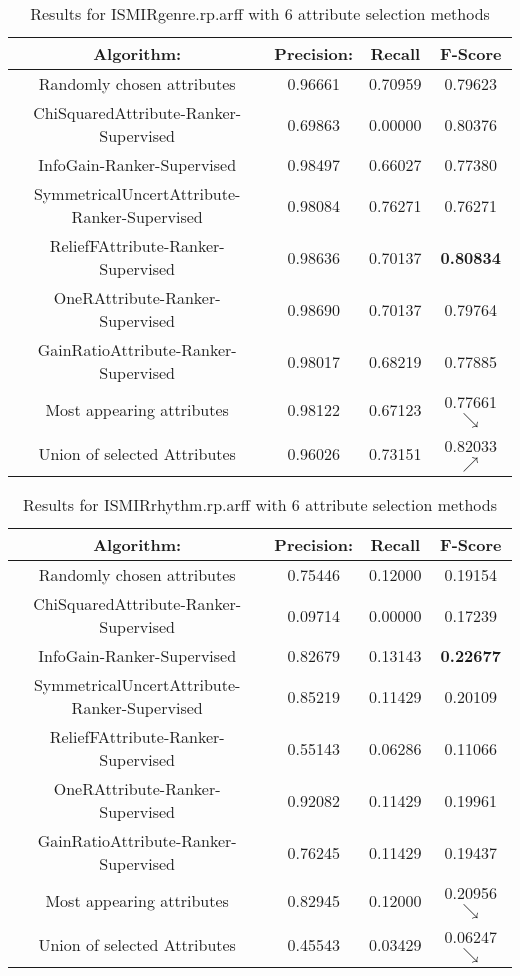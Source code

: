 \begin{table}[p]
\begin{center}
\begin{tabular}{|c|c|c|c|}
\hline Algorithm: & Precision: & Recall & F-Score\\
\hline Randomly chosen attributes & 0.96661 & 0.70959 & 0.79623\\
\hline ChiSquaredAttribute-Ranker-Supervised & 0.69863 & 0.00000 & 0.80376\\
\hline InfoGain-Ranker-Supervised & 0.98497 & 0.66027 & 0.77380\\
\hline SymmetricalUncertAttribute-Ranker-Supervised & 0.98084 & 0.76271 &
0.76271\\
\hline ReliefFAttribute-Ranker-Supervised & 0.98636 & 0.70137 & {\bf 0.80834}\\
\hline OneRAttribute-Ranker-Supervised & 0.98690 & 0.70137 & 0.79764\\
\hline GainRatioAttribute-Ranker-Supervised & 0.98017 & 0.68219 & 0.77885\\
\hline Most appearing attributes & 0.98122 & 0.67123 & 0.77661 $\searrow$\\
\hline Union of selected Attributes & 0.96026 & 0.73151 & 0.82033 $\nearrow$\\

\hline
\end{tabular}
\caption{Results for ISMIRgenre.rp.arff with 6 attribute selection methods}
\label{table:classifier:ISMIRgenre6}
\end{center}
\end{table}



\begin{table}[p]
\begin{center}
\begin{tabular}{|c|c|c|c|}
\hline Algorithm: & Precision: & Recall & F-Score\\
\hline Randomly chosen attributes & 0.75446 & 0.12000 & 0.19154\\
\hline ChiSquaredAttribute-Ranker-Supervised & 0.09714 & 0.00000 & 0.17239\\
\hline InfoGain-Ranker-Supervised & 0.82679 & 0.13143 & {\bf 0.22677}\\
\hline SymmetricalUncertAttribute-Ranker-Supervised & 0.85219 & 0.11429 &
0.20109\\
\hline ReliefFAttribute-Ranker-Supervised & 0.55143 & 0.06286 & 0.11066\\
\hline OneRAttribute-Ranker-Supervised & 0.92082 & 0.11429 & 0.19961\\
\hline GainRatioAttribute-Ranker-Supervised & 0.76245 & 0.11429 & 0.19437\\
\hline Most appearing attributes & 0.82945 & 0.12000 & 0.20956 $\searrow$\\
\hline Union of selected Attributes & 0.45543 & 0.03429 & 0.06247 $\searrow$\\

\hline
\end{tabular}
\caption{Results for ISMIRrhythm.rp.arff with 6 attribute selection methods}
\label{table:classifier:ISMIRrhythm6}
\end{center}
\end{table}


